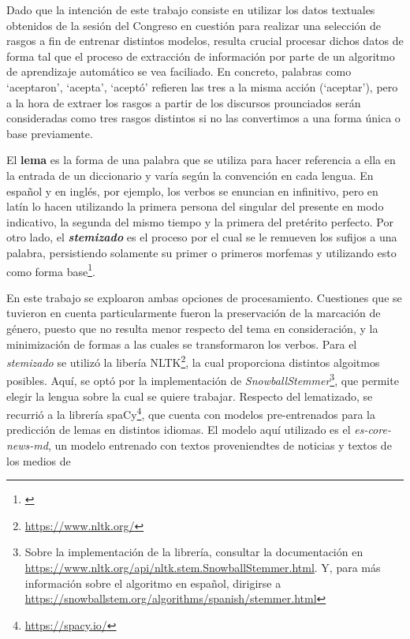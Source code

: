 Dado que la intención de este trabajo consiste en utilizar los datos textuales
obtenidos de la sesión del Congreso en cuestión para realizar una selección
de rasgos a fin de entrenar distintos modelos, resulta crucial procesar dichos
datos de forma tal que el proceso de extracción de información por parte
de un algoritmo de aprendizaje automático se vea faciliado. En concreto, palabras
como `aceptaron', `acepta', `aceptó' refieren las tres a la misma acción (`aceptar'),
pero a la hora de extraer los rasgos a partir de los discursos prounciados serán
consideradas como tres rasgos distintos si no las convertimos a una forma única o
base previamente.
\par
El \textbf{lema} es la forma de una palabra que se utiliza para hacer referencia a ella
en la entrada de un diccionario y varía según la convención en cada lengua. En español
y en inglés, por ejemplo, los verbos se enuncian en infinitivo, pero en latín lo hacen
utilizando la primera persona del singular del presente en modo indicativo, la segunda
del mismo tiempo y la primera del pretérito perfecto. Por otro lado, el
\textbf{\textit{stemizado}} es el proceso por el cual se le remueven los sufijos
a una palabra, persistiendo solamente su primer o primeros morfemas y utilizando
esto como forma base\footnote{\citet[Capítulo~3]{bird2009natural}}.
\par
En este trabajo se exploaron ambas opciones de procesamiento. Cuestiones que se tuvieron
en cuenta particularmente fueron la preservación de la marcación de género, puesto que
no resulta menor respecto del tema en consideración, y la minimización de formas a las
cuales se transformaron los verbos. Para el \textit{stemizado} se utilizó la
libería NLTK\footnote{\url{https://www.nltk.org/}}, la cual proporciona distintos algoitmos posibles. Aquí, se optó por la
implementación de \textit{SnowballStemmer}\footnote{Sobre la implementación de la
librería, consultar la documentación en
\url{https://www.nltk.org/api/nltk.stem.SnowballStemmer.html}. Y, para más información
sobre el algoritmo en español, dirigirse a
\url{https://snowballstem.org/algorithms/spanish/stemmer.html}}, que permite elegir
la lengua sobre la cual se quiere trabajar. Respecto del lematizado, se recurrió
a la librería spaCy\footnote{\url{https://spacy.io/}}, que cuenta con modelos
pre-entrenados para la predicción de lemas en distintos idiomas. El modelo aquí
utilizado es el \textit{es-core-news-md}, un modelo entrenado con textos
proveniendtes de noticias y textos de los medios de
